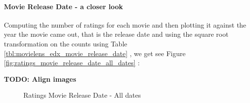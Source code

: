 \documentclass[
]{article}
\begin{document}
\newpage

\hypertarget{movie-release-date---a-closer-look}{%
\paragraph{Movie Release Date - a closer
look}\label{movie-release-date---a-closer-look}}

Computing the number of ratings for each movie and then plotting it
against the year the movie came out, that is the release date and using
the square root transformation on the counts using Table
\ref{tbl:movielens_edx_movie_release_date} , we get see Figure
\ref{fig:ratings_movie_release_date_all_dates} :

\textbf{TODO: Align images}

\begin{figure}[h!]

{\centering {}\newline{}

}

\caption{Ratings Movie Release Date - All dates\label{fig:ratings_movie_release_date_all_dates}}\label{fig:md_1}
\end{figure}
\end{document}

